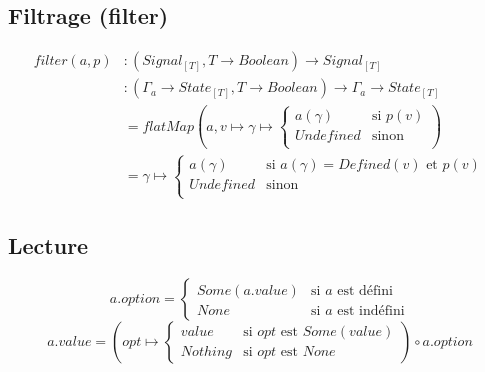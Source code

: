 	\subsection{Filtrage (filter)}
	
		\begin{align*}
			filter(a, p)
				&\colon (Signal_{[T]}, T \to Boolean) \to Signal_{[T]} \\
				&\colon (\Gamma_a \to State_{[T]}, T \to Boolean) \to \Gamma_a \to State_{[T]} \\
				&= flatMap \left( a, v \mapsto \gamma \mapsto \begin{cases}
					a(\gamma) & \text{si } p(v)\\
					Undefined & \text{sinon}\\
				\end{cases} \right)\\
				&= \gamma \mapsto \begin{cases}
					a(\gamma) & \text{si } a(\gamma) = Defined(v) \text{ et } p(v)\\
					Undefined & \text{sinon}\\
				\end{cases}
		\end{align*}
		
	\subsection{Lecture}
	
		\[
			a.option = \begin{cases}
				Some(a.value) & \text{si } a \text{ est défini}\\
				None & \text{si } a \text{ est indéfini}
			\end{cases}
		\]
		\[
			a.value = \left(opt \mapsto \begin{cases}
				value & \text{si } opt \text{ est } Some(value)\\
				Nothing & \text{si } opt \text{ est } None
			\end{cases}\right) \circ a.option
		\]
